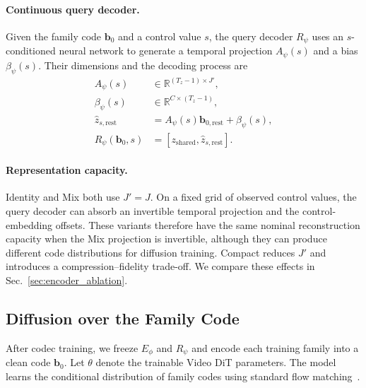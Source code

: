 \paragraph{Continuous query decoder.}
Given the family code $\mathbf b_0$ and a control value $s$,
the query decoder $R_\psi$ uses an $s$-conditioned neural network
to generate a temporal projection $A_\psi(s)$ and a bias
$\beta_\psi(s)$. Their dimensions and the decoding process are
\begin{equation}
\begin{aligned}
    A_\psi(s)
    &\in\mathbb R^{(T_z-1)\times J'},\\
    \beta_\psi(s)
    &\in\mathbb R^{C\times(T_z-1)},\\
    \hat z_{s,\mathrm{rest}}
    &=A_\psi(s)\mathbf b_{0,\mathrm{rest}}+\beta_\psi(s),\\
    R_\psi(\mathbf b_0,s)
    &=[z_{\mathrm{shared}},\hat z_{s,\mathrm{rest}}].
\end{aligned}
\label{eq:direct_query}
\end{equation}


\paragraph{Representation capacity.}
Identity and Mix both use $J'=J$. On a fixed grid of observed control
values, the query decoder can absorb an invertible temporal projection
and the control-embedding offsets. These variants therefore have the
same nominal reconstruction capacity when the Mix projection is
invertible, although they can produce different code distributions for
diffusion training. Compact reduces $J'$ and introduces a
compression--fidelity trade-off. We compare these effects in
Sec.~\ref{sec:encoder_ablation}.

\subsection{Diffusion over the Family Code}
\label{sec:learning}

After codec training, we freeze $E_\phi$ and $R_\psi$ and encode each
training family into a clean code $\mathbf b_0$. Let $\theta$ denote the
trainable Video DiT parameters. The model learns the conditional
distribution of family codes using standard flow
matching~\cite{lipman2023flow}.

